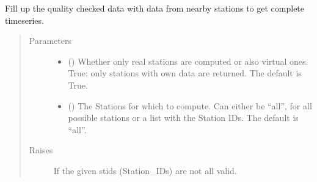 \documentclass[letterpaper,10pt,english]{sphinxmanual}
\begin{document}
\begin{fulllineitems}
\begin{fulllineitems}
\end{fulllineitems}


\begin{fulllineitems}
\label{\detokenize{weatherDB:weatherDB.stations.StationsBase.fillup}}
\sphinxAtStartPar
Fill up the quality checked data with data from nearby stations to get complete timeseries.
\begin{quote}\begin{description}
\item[{Parameters}] \leavevmode\begin{itemize}
\item {} 
\sphinxAtStartPar
{} (\sphinxstyleliteralemphasis{\sphinxupquote{, }}) \textendash{} Whether only real stations are computed or also virtual ones.
True: only stations with own data are returned.
The default is True.

\item {} 
\sphinxAtStartPar
{} (\sphinxstyleliteralemphasis{\sphinxupquote{, }}) \textendash{} The Stations for which to compute.
Can either be “all”, for all possible stations
or a list with the Station IDs.
The default is “all”.

\end{itemize}

\item[{Raises}] \leavevmode
\sphinxAtStartPar
{} \textendash{} If the given stids (Station\_IDs) are not all valid.

\end{description}\end{quote}

\end{fulllineitems}


\end{fulllineitems}
\end{document}
